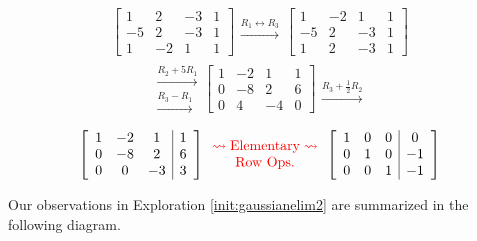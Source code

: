 \documentclass{ximera}
\begin{document}
\begin{exploration}
$$\left[\begin{array}{ccc|c}  
 1&2&-3&1\\-5&2&-3&1\\1&-2&1&1
 \end{array}\right]
 \begin{array}{c}
 \\
 \xrightarrow{R_1\leftrightarrow R_3}\\
\\
 \end{array}
\left[\begin{array}{ccc|c}  
 1&-2&1&1\\-5&2&-3&1\\1&2&-3&1
 \end{array}\right]$$
$$\begin{array}{c}
 \\
 \xrightarrow{R_2+5R_1}\\
 \xrightarrow{R_3-R_1}\\
 \end{array}
\left[\begin{array}{ccc|c}  
 1&-2&1&1\\0&-8&2&6\\0&4&-4&0
 \end{array}\right]
 \begin{array}{c}
 \\
 \\
 \xrightarrow{R_3+\frac{1}{2}R_2}\\
 \end{array}
$$
\begin{equation*}
  \left[\begin{array}{ccc|c}  
 1&-2&1&1\\0&-8&2&6\\0&0&-3&3
 \end{array}\right]
 \color{red}
 \begin{array}{c}
\rightsquigarrow\text{Elementary}\rightsquigarrow\\
\text{Row Ops.}
\end{array}
 \color{black}
  \left[\begin{array}{ccc|c}  
 1&0&0&0\\0&1&0&-1\\0&0&1&-1
 \end{array}\right]
\end{equation*}
\end{exploration}

Our observations in Exploration \ref{init:gaussianelim2} are summarized in the following diagram.
\end{document}
